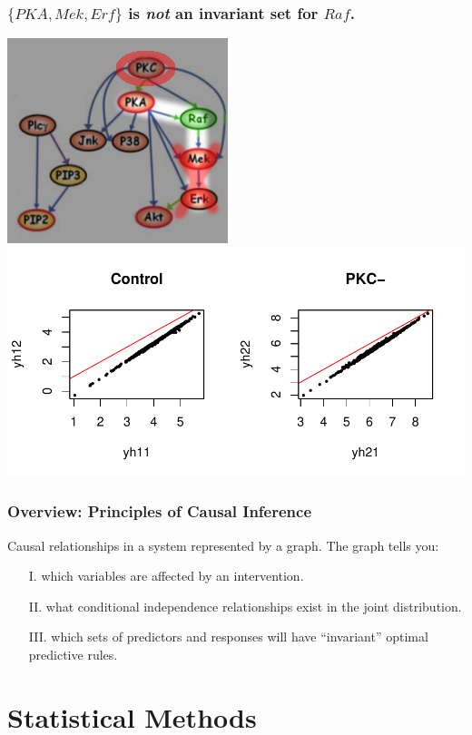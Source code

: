 \documentclass{beamer}
\begin{document}
\begin{frame}
\frametitle{$\{PKA, Mek, Erf\}$ is \emph{not} an invariant set for $Raf$.}
\begin{center}
\includegraphics[scale = 0.3]{../images/fig05_02.png}\hspace{0.5in}
\includegraphics[scale = 0.6]{../images/plot05_01.pdf}
\end{center}
\end{frame}



\begin{frame}
\frametitle{Overview: Principles of Causal Inference}
Causal relationships in a system represented by a graph.  The graph tells you:
\begin{itemize}
\item[I.] which variables are affected by an intervention.
\item[II.] what conditional independence relationships exist in the joint distribution.
\item[III.] which sets of predictors and responses will have ``invariant'' optimal predictive rules.
\end{itemize}
\end{frame}

\section{Statistical Methods}
\end{document}
